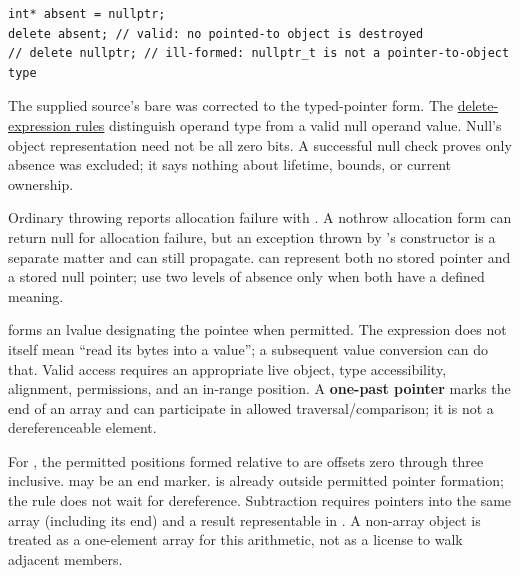 \begin{verbatim}
int* absent = nullptr;
delete absent; // valid: no pointed-to object is destroyed
// delete nullptr; // ill-formed: nullptr_t is not a pointer-to-object type
\end{verbatim}

The supplied source's bare  was corrected to the typed-pointer form. The \href{https://eel.is/c++draft/expr.delete}{delete-expression rules} distinguish operand type from a valid null operand value. Null's object representation need not be all zero bits. A successful null check proves only absence was excluded; it says nothing about lifetime, bounds, or current ownership.

Ordinary throwing  reports allocation failure with . A nothrow allocation form can return null for allocation failure, but an exception thrown by 's constructor is a separate matter and can still propagate.  can represent both no stored pointer and a stored null pointer; use two levels of absence only when both have a defined meaning.

 forms an lvalue designating the pointee when permitted. The expression does not itself mean ``read its bytes into a value''; a subsequent value conversion can do that. Valid access requires an appropriate live object, type accessibility, alignment, permissions, and an in-range position. A \textbf{one-past pointer} marks the end of an array and can participate in allowed traversal/comparison; it is not a dereferenceable element.

For , the permitted positions formed relative to  are offsets zero through three inclusive.  may be an end marker.  is already outside permitted pointer formation; the rule does not wait for dereference. Subtraction requires pointers into the same array (including its end) and a result representable in . A non-array object is treated as a one-element array for this arithmetic, not as a license to walk adjacent members.

